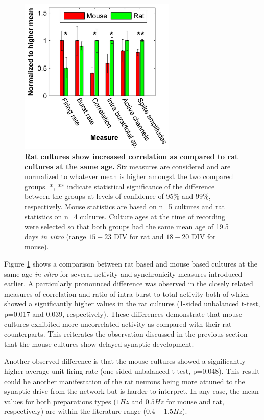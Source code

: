        \begin{figure}[!htb]
            \centering
            \includegraphics[width=7.5cm]{chapter3/figures/mouseRatComp/ratMouseComp.jpg}

            \caption[Comparison between spontaneous activity in mouse and rat based cultures]{\textbf{Rat cultures show increased correlation as compared to rat cultures at the same age.} Six measures are considered and are normalized to whatever mean is higher amongst the two compared groups. *, ** indicate statistical significance of the difference between the groups at levels of confidence of 95\% and 99\%, respectively. Mouse statistics are based on n=5 cultures and rat statistics on n=4 cultures. Culture ages at the time of recording were selected so that both groups had the same mean age of 19.5 days \textit{in vitro} (range \(15-23\) DIV for rat and \(18-20\) DIV for mouse).}
            \label{fig:activity:mouseRatComparison}
       \end{figure}

    Figure \ref{fig:activity:mouseRatComparison} shows a comparison between rat based and mouse based cultures at the same age \textit{in vitro} for several activity and synchronicity measures introduced earlier. A particularly pronounced difference was observed in the closely related measures of correlation and ratio of intra-burst to total activity both of which showed a significantly higher values in the rat cultures (1-sided unbalanced t-test, p=0.017 and 0.039, respectively). These differences demonstrate that mouse cultures exhibited more uncorrelated activity as compared with their rat counterparts. This reiterates the observation discussed in the previous section that the mouse cultures show delayed synaptic development.

    Another observed difference is that the mouse cultures showed a significantly higher average unit firing rate (one sided unbalanced t-test, p=0.048). This result could be another manifestation of the rat neurons being more attuned to the synaptic drive from the network but is harder to interpret. In any case, the mean values for both preparations types (\(1 Hz\) and \(0.5 Hz\) for mouse and rat, respectively) are within the literature range (\(0.4-1.5 Hz\)).

